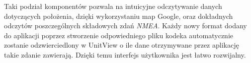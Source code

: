 \documentclass[skorowidz,skroty]{dyplomWEZUT}
\begin{document}
	Taki podział komponentów pozwala na intuicyjne odczytywanie danych dotyczących położenia, dzięki wykorzystaniu map Google, oraz dokładnych odczytów poszczególnych składowych zdań \textit{NMEA}. Każdy nowy format dodany do aplikacji poprzez stworzenie odpowiedniego pliku kodeka automatycznie zostanie odzwierciedlony w UnitView o ile dane otrzymywane przez aplikację takie zdanie zawierają. Dzięki temu interfejs użytkownika jest łatwo rozwijalny.


%
%
%
%
\end{document}
